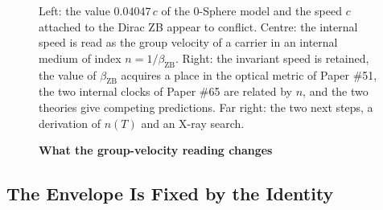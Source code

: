 \documentclass[%
 reprint, amsmath,amssymb, aps, prb, ]{revtex4-2}
\numberwithin{equation}{section}
\begin{document}
\begin{figure}[t!]
\caption{\textbf{What the group-velocity reading changes}}
\label{fig:flow}
\vspace{0.4em}
\begin{minipage}{0.95\textwidth}
\justifying\small
Left: the value $0.04047\,c$ of the 0-Sphere model and the speed $c$ attached to the Dirac ZB appear to conflict. Centre: the internal speed is read as the group velocity of a carrier in an internal medium of index $n = 1/\beta_{\text{ZB}}$. Right: the invariant speed is retained, the value of $\beta_{\text{ZB}}$ acquires a place in the optical metric of Paper \#51, the two internal clocks of Paper \#65 are related by $n$, and the two theories give competing predictions. Far right: the two next steps, a derivation of $n(T)$ and an X-ray search.
\end{minipage}
\end{figure}

\subsection{The Envelope Is Fixed by the Identity}
\label{app:envelope}
\end{document}
